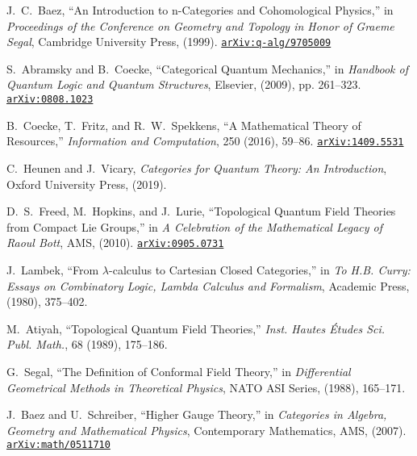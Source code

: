 \documentclass[12pt]{article}
\begin{document}
\vspace{1em}

\begin{thebibliography}{9}

J.\ C.\ Baez, ``An Introduction to n-Categories and Cohomological Physics,'' in \textit{Proceedings of the Conference on Geometry and Topology in Honor of Graeme Segal}, Cambridge University Press, (1999). \href{https://arxiv.org/abs/q-alg/9705009}{\texttt{arXiv:q-alg/9705009}}

S.\ Abramsky and B.\ Coecke, ``Categorical Quantum Mechanics,'' in \textit{Handbook of Quantum Logic and Quantum Structures}, Elsevier, (2009), pp. 261--323. \href{https://arxiv.org/abs/0808.1023}{\texttt{arXiv:0808.1023}}

B.\ Coecke, T.\ Fritz, and R.\ W.\ Spekkens, ``A Mathematical Theory of Resources,'' \textit{Information and Computation}, 250 (2016), 59--86. \href{https://arxiv.org/abs/1409.5531}{\texttt{arXiv:1409.5531}}

C.\ Heunen and J.\ Vicary, \textit{Categories for Quantum Theory: An Introduction}, Oxford University Press, (2019).

D.\ S.\ Freed, M.\ Hopkins, and J.\ Lurie, ``Topological Quantum Field Theories from Compact Lie Groups,'' in \textit{A Celebration of the Mathematical Legacy of Raoul Bott}, AMS, (2010). \href{https://arxiv.org/abs/0905.0731}{\texttt{arXiv:0905.0731}}

J.\ Lambek, ``From $\lambda$-calculus to Cartesian Closed Categories,'' in \textit{To H.B. Curry: Essays on Combinatory Logic, Lambda Calculus and Formalism}, Academic Press, (1980), 375--402.

M.\ Atiyah, ``Topological Quantum Field Theories,'' \textit{Inst. Hautes \'Etudes Sci. Publ. Math.}, 68 (1989), 175--186.

G.\ Segal, ``The Definition of Conformal Field Theory,'' in \textit{Differential Geometrical Methods in Theoretical Physics}, NATO ASI Series, (1988), 165--171.

J.\ Baez and U.\ Schreiber, ``Higher Gauge Theory,'' in \textit{Categories in Algebra, Geometry and Mathematical Physics}, Contemporary Mathematics, AMS, (2007). \href{https://arxiv.org/abs/math/0511710}{\texttt{arXiv:math/0511710}}

\end{thebibliography}
\end{document}
